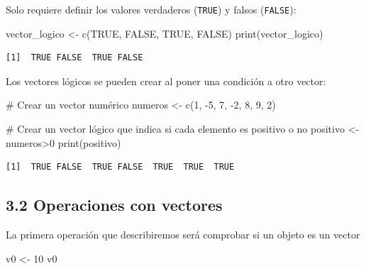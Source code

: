 \documentclass[
  letterpaper,
  DIV=11,
  numbers=noendperiod]{scrreprt}
\newenvironment{Shaded}{\begin{snugshade}}{\end{snugshade}}
\newcommand{\CommentTok}[1]{\textcolor[rgb]{0.37,0.37,0.37}{#1}}
\newcommand{\ConstantTok}[1]{\textcolor[rgb]{0.56,0.35,0.01}{#1}}
\newcommand{\DecValTok}[1]{\textcolor[rgb]{0.68,0.00,0.00}{#1}}
\newcommand{\FunctionTok}[1]{\textcolor[rgb]{0.28,0.35,0.67}{#1}}
\newcommand{\NormalTok}[1]{\textcolor[rgb]{0.00,0.23,0.31}{#1}}
\newcommand{\OtherTok}[1]{\textcolor[rgb]{0.00,0.23,0.31}{#1}}
\newcommand{\SpecialCharTok}[1]{\textcolor[rgb]{0.37,0.37,0.37}{#1}}
\begin{document}
Solo requiere definir los valores verdaderos (\texttt{TRUE}) y falsos
(\texttt{FALSE}):

\begin{Shaded}
\begin{Highlighting}[]
\NormalTok{vector\_logico }\OtherTok{\textless{}{-}} \FunctionTok{c}\NormalTok{(}\ConstantTok{TRUE}\NormalTok{, }\ConstantTok{FALSE}\NormalTok{, }\ConstantTok{TRUE}\NormalTok{, }\ConstantTok{FALSE}\NormalTok{)}
\FunctionTok{print}\NormalTok{(vector\_logico)}
\end{Highlighting}
\end{Shaded}

\begin{verbatim}
[1]  TRUE FALSE  TRUE FALSE
\end{verbatim}

Los vectores lógicos se pueden crear al poner una condición a otro
vector:

\begin{Shaded}
\begin{Highlighting}[]
\CommentTok{\# Crear un vector numérico}
\NormalTok{numeros }\OtherTok{\textless{}{-}} \FunctionTok{c}\NormalTok{(}\DecValTok{1}\NormalTok{, }\SpecialCharTok{{-}}\DecValTok{5}\NormalTok{, }\DecValTok{7}\NormalTok{, }\SpecialCharTok{{-}}\DecValTok{2}\NormalTok{, }\DecValTok{8}\NormalTok{, }\DecValTok{9}\NormalTok{, }\DecValTok{2}\NormalTok{)}

\CommentTok{\# Crear un vector lógico que indica si cada elemento es positivo o no}
\NormalTok{positivo }\OtherTok{\textless{}{-}}\NormalTok{ numeros}\SpecialCharTok{\textgreater{}}\DecValTok{0}
\FunctionTok{print}\NormalTok{(positivo)}
\end{Highlighting}
\end{Shaded}

\begin{verbatim}
[1]  TRUE FALSE  TRUE FALSE  TRUE  TRUE  TRUE
\end{verbatim}

\hypertarget{operaciones-con-vectores}{%
\subsection{3.2 Operaciones con
vectores}\label{operaciones-con-vectores}}

La primera operación que describiremos será comprobar si un objeto es un
vector

\begin{Shaded}
\begin{Highlighting}[]
\NormalTok{v0 }\OtherTok{\textless{}{-}} \DecValTok{10}
\NormalTok{v0}
\end{Highlighting}
\end{Shaded}
\end{document}
